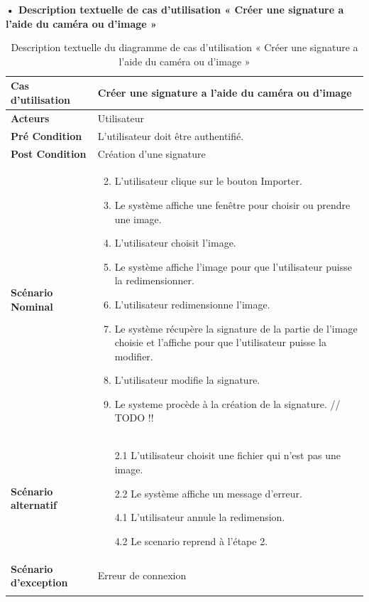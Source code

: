 \textbf{•	Description textuelle de cas d'utilisation « Créer une signature a l'aide du caméra ou d'image »}
\begin{longtable}{|p{5cm}|p{10cm}|}
\hline
\textbf{Cas d'utilisation}&Créer une signature a l'aide du caméra ou d'image\\
\hline
\textbf{Acteurs}&Utilisateur \\
\hline
\textbf{Pré Condition}&L'utilisateur doit être authentifié.\\
\hline
\textbf{Post Condition}&Création d'une signature\\
\hline
\textbf{Scénario Nominal}&
\vspace{-\baselineskip}
\begin{enumerate}
    \setcounter{enumi}{1}
    \item L'utilisateur clique sur le bouton Importer.
    \item Le système affiche une fenêtre pour choisir ou prendre une image.
    \item L'utilisateur choisit l'image.
    \item Le système affiche l'image pour que l'utilisateur puisse la redimensionner.
    \item L'utilisateur redimensionne l'image.
    \item Le système récupère la signature de la partie de l'image choisie et l'affiche pour que l'utilisateur puisse la modifier.
    \item L'utilisateur modifie la signature.
    \item Le systeme procède à la création de la signature. // TODO !!
\end{enumerate}\\
\hline
\textbf{Scénario alternatif}&
\begin{enumerate}
  \item [2.1] L'utilisateur choisit une fichier qui n'est pas une image.
  \item [2.2] Le système affiche un message d'erreur.
  \item [4.1] L'utilisateur annule la redimension.
  \item [4.2] Le scenario reprend à l'étape 2.
\end{enumerate}\\
\hline
\textbf{Scénario d'exception}&Erreur de connexion\\
\hline
\caption{Description textuelle du diagramme de cas d'utilisation « Créer une signature a l'aide du caméra ou d'image »}
\label{tab:use_case_create_signature_from_image}
\end{longtable}

